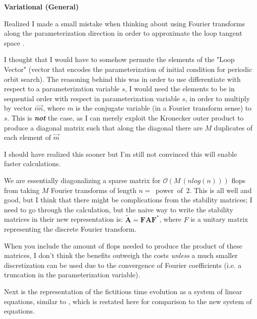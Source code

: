 {\bf Variational {\Descent} (General)}

Realized I made a small mistake when thinking about using Fourier transforms along
the parameterization direction in order to approximate the loop tangent space .

I thought that I would have to somehow permute the elements  of the "Loop Vector" (vector that
encodes the parameterization of initial condition for periodic orbit search). The reasoning behind this
was in order to use differentiate with respect to a parameterization variable $s$, I would need
the elements to be in sequential order with respect in parameterization variable $s$, in order to
multiply by vector $i \vec{m}$, where $m$ is the conjugate variable (in a Fourier transform sense)
to $s$. This is \textbf{\emph{not}}
the case, as I can merely exploit the Kronecker outer product to produce a diagonal matrix such that
along the diagonal there are $M$ duplicates of each element of $\vec{m}$

I should have realized this sooner
but I'm still not convinced this will enable faster calculations.

We are essentially diagonalizing a sparse matrix for $\mathcal{O}(M\,(n log(n)))$ flops
from taking $M$ Fourier transforms of length $n =$~power~of~$2$.
This is all well and good, but I think that there might be complications from the stability matrices;
I need to go through the calculation, but the naive way to write the
stability matrices in their new representation is:
 $\tilde{\mathbf{A}} = \mathbf{F} \mathbf{A} \mathbf{F^{*}}$, where $F$
is a unitary matrix representing the discrete Fourier transform.

When you include the amount of flops needed to produce the product of these matrices, I don't think
the benefits outweigh the costs \emph{unless} a much smaller discretization can be used due to the
convergence of Fourier coefficients (i.e. a truncation in the parameterization variable).

Next is the representation of the fictitious time evolution as a system of linear equations, similar to
, which is restated here for comparison to the new system of equations.

